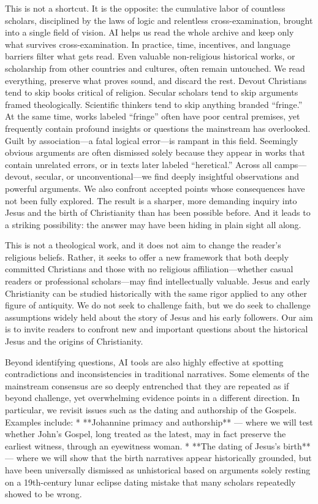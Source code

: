 This is not a shortcut.
It is the opposite: the cumulative labor of countless scholars, disciplined by the laws of logic and relentless cross-examination, brought into a single field of vision.
AI helps us read the whole archive and keep only what survives cross-examination.
In practice, time, incentives, and language barriers filter what gets read.
Even valuable non-religious historical works, or scholarship from other countries and cultures, often remain untouched.
We read everything, preserve what proves sound, and discard the rest.
Devout Christians tend to skip books critical of religion.
Secular scholars tend to skip arguments framed theologically.
Scientific thinkers tend to skip anything branded “fringe.”
At the same time, works labeled “fringe” often have poor central premises, yet frequently contain profound insights or questions the mainstream has overlooked.
Guilt by association—a fatal logical error—is rampant in this field.
Seemingly obvious arguments are often dismissed solely because they appear in works that contain unrelated errors, or in texts later labeled “heretical.”
Across all camps—devout, secular, or unconventional—we find deeply insightful observations and powerful arguments.
We also confront accepted points whose consequences have not been fully explored.
The result is a sharper, more demanding inquiry into Jesus and the birth of Christianity than has been possible before.
And it leads to a striking possibility: the answer may have been hiding in plain sight all along.

This is not a theological work, and it does not aim to change the reader’s religious beliefs.
Rather, it seeks to offer a new framework that both deeply committed Christians and those with no religious affiliation—whether casual readers or professional scholars—may find intellectually valuable.
Jesus and early Christianity can be studied historically with the same rigor applied to any other figure of antiquity.
We do not seek to challenge faith, but we do seek to challenge assumptions widely held about the story of Jesus and his early followers.
Our aim is to invite readers to confront new and important questions about the historical Jesus and the origins of Christianity.

Beyond identifying questions, AI tools are also highly effective at spotting contradictions and inconsistencies in traditional narratives.
Some elements of the mainstream consensus are so deeply entrenched that they are repeated as if beyond challenge, yet overwhelming evidence points in a different direction.
In particular, we revisit issues such as the dating and authorship of the Gospels.
Examples include:
* **Johannine primacy and authorship** — where we will test whether John’s Gospel, long treated as the latest, may in fact preserve the earliest witness, through an eyewitness woman.
* **The dating of Jesus’s birth** — where we will show that the birth narratives appear historically grounded, but have been universally dismissed as unhistorical based on arguments solely resting on a 19th-century lunar eclipse dating mistake that many scholars repeatedly showed to be wrong.

